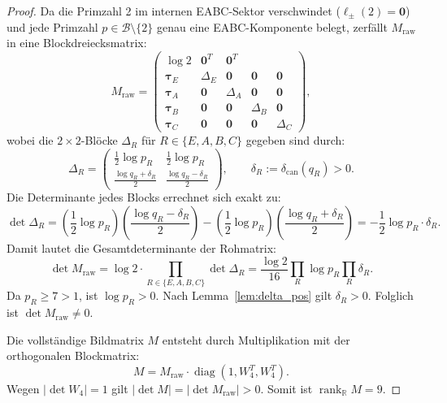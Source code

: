 \documentclass[11pt,a4paper]{article}
\theoremstyle{plain}
\theoremstyle{definition}
\newcommand{\R}{\mathbb{R}}
\DeclareMathOperator{\rank}{rank}
\DeclareMathOperator{\diag}{diag}
\begin{document}
\begin{proof}
Da die Primzahl 2 im internen EABC-Sektor verschwindet ($\boldsymbol{\ell}_\pm(2) = \mathbf{0}$) und jede Primzahl $p \in \mathcal{B} \setminus \{2\}$ genau eine EABC-Komponente belegt, zerfällt $M_{\mathrm{raw}}$ in eine Blockdreiecksmatrix:
\begin{equation}
    M_{\mathrm{raw}} = \begin{pmatrix}
        \log 2 & \mathbf{0}^T & \mathbf{0}^T \\
        \boldsymbol{\tau}_E & \Delta_E & \mathbf{0} & \mathbf{0} & \mathbf{0} \\
        \boldsymbol{\tau}_A & \mathbf{0} & \Delta_A & \mathbf{0} & \mathbf{0} \\
        \boldsymbol{\tau}_B & \mathbf{0} & \mathbf{0} & \Delta_B & \mathbf{0} \\
        \boldsymbol{\tau}_C & \mathbf{0} & \mathbf{0} & \mathbf{0} & \Delta_C
    \end{pmatrix},
\end{equation}
wobei die $2 \times 2$-Blöcke $\Delta_R$ für $R \in \{E, A, B, C\}$ gegeben sind durch:
\begin{equation}
    \Delta_R = \begin{pmatrix}
        \frac{1}{2}\log p_R & \frac{1}{2}\log p_R \\[0.5em]
        \frac{\log q_R + \delta_R}{2} & \frac{\log q_R - \delta_R}{2}
    \end{pmatrix}, \qquad \delta_R := \delta_{\mathrm{can}}(q_R) > 0.
\end{equation}
Die Determinante jedes Blocks errechnet sich exakt zu:
\begin{equation}
    \det \Delta_R = \left(\frac{1}{2}\log p_R\right)\left(\frac{\log q_R - \delta_R}{2}\right) - \left(\frac{1}{2}\log p_R\right)\left(\frac{\log q_R + \delta_R}{2}\right) = -\frac{1}{2} \log p_R \cdot \delta_R.
\end{equation}
Damit lautet die Gesamtdeterminante der Rohmatrix:
\begin{equation}
    \det M_{\mathrm{raw}} = \log 2 \cdot \prod_{R \in \{E,A,B,C\}} \det \Delta_R = \frac{\log 2}{16} \prod_{R} \log p_R \prod_{R} \delta_R.
\end{equation}
Da $p_R \ge 7 > 1$, ist $\log p_R > 0$. Nach Lemma~\ref{lem:delta_pos} gilt $\delta_R > 0$. Folglich ist $\det M_{\mathrm{raw}} \neq 0$.

Die vollständige Bildmatrix $M$ entsteht durch Multiplikation mit der orthogonalen Blockmatrix:
\begin{equation}
    M = M_{\mathrm{raw}} \cdot \diag(1, W_4^T, W_4^T).
\end{equation}
Wegen $\vert{}\det W_4\vert{} = 1$ gilt $\vert{}\det M\vert{} = \vert{}\det M_{\mathrm{raw}}\vert{} > 0$. Somit ist $\rank_\R M = 9$.
\end{proof}
\end{document}

